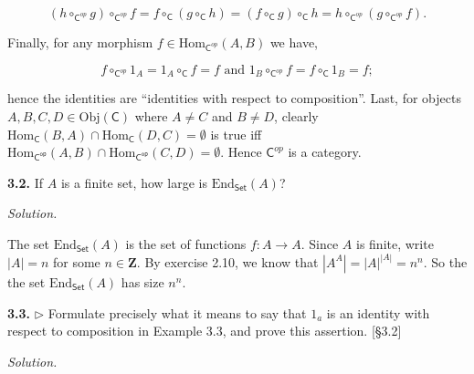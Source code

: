 \documentclass[14pt,parskip=full]{scrartcl}
\newcommand{\exercise}[3]{
\noindent
\textbf{#1.} #2

\noindent
\textit{Solution.}{\let\tpar\par \let\par\relax #3}
}
\newcommand{\Obj}{\mathrm{Obj}}
\newcommand{\Hom}{\mathrm{Hom}}
\newcommand\abs[1]{\left|#1\right|}
\begin{document}
{\[ (h \circ_{\mathsf{C}^{op}} g) \circ_{\mathsf{C}^{op}} f = f
\circ_{\mathsf{C}} (g \circ_{\mathsf{C}} h) = (f \circ_{\mathsf{C}} g)
\circ_{\mathsf{C}} h = h \circ_{\mathsf{C}^{op}} (g \circ_{\mathsf{C}^{op}} f).
\]

Finally, for any morphism $f\in\Hom_{\mathsf{C}^{op}}(A,B)$ we have,

\[ f \circ_{\mathsf{C}^{op}} 1_A = 1_A \circ_{\mathsf{C}} f = f \text{ and }
1_B \circ_{\mathsf{C}^{op}} f = f \circ_{\mathsf{C}} 1_B = f; \]

hence the identities are ``identities with respect to composition''. Last, for
objects $A,B,C,D\in\Obj(\mathsf{C})$ where $A\neq C$ and $B\neq D$,
clearly $\Hom_{\mathsf{C}}(B,A)\cap\Hom_{\mathsf{C}}(D,C)=\emptyset$ is true iff 
$\Hom_{\mathsf{C^{op}}}(A,B)\cap\Hom_{\mathsf{C^{op}}}(C,D)=\emptyset$. Hence
$\mathsf{C}^{op}$ is a category.

}

\exercise
{3.2}{If $A$ is a finite set, how large is $\mathrm{End}_{\mathsf{Set}}(A)$?}{

The set $\mathrm{End}_{\mathsf{Set}}(A)$ is the set of functions $f:A\to A$.
Since $A$ is finite, write $\abs{A} = n$ for some $n\in\mathbf{Z}$. By exercise
2.10, we know that $\abs{A^A} = \abs{A}^{\abs{A}} = n^n$. So the the set
$\mathrm{End}_{\mathsf{Set}}(A)$ has size $n^n$.

}

\exercise
{3.3}{$\rhd$ Formulate precisely what it means to say that $1_a$ is an identity
with respect to composition in Example 3.3, and prove this assertion. [\S3.2]}{



}
\end{document}
